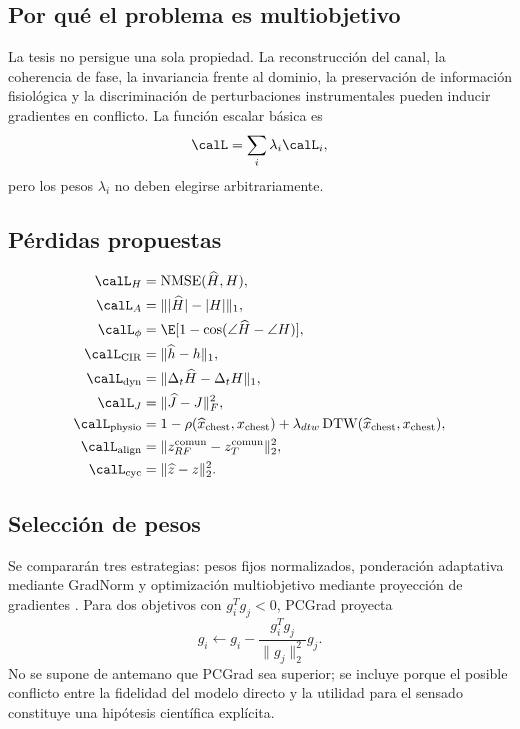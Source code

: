 \subsection{Por qué el problema es multiobjetivo}

La tesis no persigue una sola propiedad. La reconstrucción del canal, la coherencia de fase, la invariancia frente al dominio, la preservación de información fisiológica y la discriminación de perturbaciones instrumentales pueden inducir gradientes en conflicto. La función escalar básica es
\begin{equation}
\calL=\sum_i\lambda_i\calL_i,
\end{equation}
pero los pesos $\lambda_i$ no deben elegirse arbitrariamente.

\subsection{Pérdidas propuestas}

\begin{align}
\calL_H & = \operatorname{NMSE}(\widehat H,H),\\
\calL_A & = \||\widehat H|-|H|\|_1,\\
\calL_\phi & = \E[1-\cos(\angle\widehat H-\angle H)],\\
\calL_{\rm CIR} & = \|\widehat h-h\|_1,\\
\calL_{\rm dyn} & = \|\Delta_t\widehat H-\Delta_tH\|_1,\\
\calL_J & = \|\widehat J-J\|_F^2,\\
\calL_{\rm physio} & = 1-\rho(\widehat x_{\rm chest},x_{\rm chest})
+\lambda_{dtw}\operatorname{DTW}(\widehat x_{\rm chest},x_{\rm chest}),\\
\calL_{\rm align}&=\|z_{RF}^{\rm comun}-z_T^{\rm comun}\|_2^2,\\
\calL_{\rm cyc}&=\|\widehat z-z\|_2^2.
\end{align}

\subsection{Selección de pesos}

Se compararán tres estrategias: pesos fijos normalizados, ponderación adaptativa mediante GradNorm y optimización multiobjetivo mediante proyección de gradientes \citep{Chen2018GradNorm,Yu2020PCGrad}. Para dos objetivos con $g_i^Tg_j<0$, PCGrad proyecta
\begin{equation}
g_i\leftarrow g_i-
\frac{g_i^Tg_j}{\|g_j\|_2^2}g_j.
\end{equation}
No se supone de antemano que PCGrad sea superior; se incluye porque el posible conflicto entre la fidelidad del modelo directo y la utilidad para el sensado constituye una hipótesis científica explícita.

